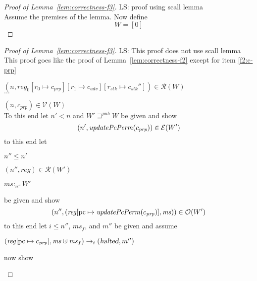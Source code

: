 \documentclass[a4paper]{article}
\newcommand{\update}[2]{[#1 \mapsto #2]}
\newcommand\lau[1]{{\color{purple} \sf \footnotesize {LS: #1}}\\}
\newcommand{\var}[1]{\mathit{#1}}
\newcommand{\hs}{\var{ms}}
\newcommand{\ms}{\hs}
\newcommand{\pcreg}{\mathrm{pc}}
\newcommand{\reg}{\var{reg}}
\newcommand{\heap}{\var{mem}}
\newcommand{\adv}{\var{adv}}
\newcommand{\stk}{\var{stk}}
\newcommand{\prp}{\var{prp}}
\newcommand{\halted}{\textsl{halted}}
\newcommand{\plainfun}[2]{
  \ifthenelse{\equal{#2}{}}
  {\mathit{#1}}
  {\mathit{#1}(#2)}
}
\newcommand{\updatePcPerm}[1]{\plainfun{updatePcPerm}{#1}}
\newcommand{\futurewk}{\mathbin{\sqsupseteq}^{\var{pub}}}
\newcommand{\heapSat}[3][\heap]{#1 :_{#2} #3}
\newcommand{\asmType}{\plaindom{AsmType}}
\newcommand{\plaindom}[1]{\mathrm{#1}}
\newcommand{\intr}[2]{\mathcal{#1}}
\newcommand{\valueintr}[1]{\intr{V}{#1}}
\newcommand{\exprintr}[1]{\intr{E}{#1}}
\newcommand{\regintr}[1]{\intr{R}{#1}}
\newcommand{\stdvr}{\valueintr{\asmType}}
\newcommand{\stder}{\exprintr{\asmType}}
\newcommand{\stdrr}{\regintr{\asmType}}
\newcommand{\observations}{\mathcal{O}}
\newcommand{\npair}[2][n]{\left(#1,#2 \right)}
\newcommand{\step}[1][]{\rightarrow_{#1}}
\begin{document}
\begin{lemma}
\begin{proof}[Proof of Lemma~\ref{lem:correctness-f3}]
\lau{proof using scall lemma}
Assume the premises of the lemma.
Now define 
\[
  W = [0 ]
\]
\end{proof}
\begin{proof}[Proof of Lemma~\ref{lem:correctness-f3}]
  \lau{This proof does not use scall lemma}
  This proof goes like the proof of Lemma~\ref{lem:correctness-f2} except for item \ref{f2:c-prp}
  \begin{enumproof}[start=3]
  \item $\npair{\reg_0\update{r_0}{c_{\var{prp}}}\update{r_1}{c_\adv}\update{r_\stk}{c_\stk''}} \in \stdrr(W)$ \\
    $\dots$
    \begin{enumproof}[start=3]
    \item $\npair{c_{\var{prp}}} \in \stdvr(W)$ \\
      To this end let $n' < n$ and $W' \futurewk W$ be given and show
      \[
        \npair[n']{\updatePcPerm{c_\prp}} \in \stder(W')
      \]
      to this end let 
      \begin{enumproof}
      \item $n'' \leq n'$
      \item $\npair[n'']{\reg} \in \stdrr(W')$
      \item $\heapSat[\ms]{n''}{W'}$ \label{f3:mem-sat-mid}
      \end{enumproof}
      be given and show
      \[
        \npair[n'']{(\reg\update{\pcreg}{\updatePcPerm{c_\prp}},\ms)} \in \observations(W')
      \]
      to this end let $i \leq n''$, $\ms_f$, and $m''$ be given and assume
      \begin{enumproof}[resume]
      \item $(\reg\update{\pcreg}{c_\prp},\ms \uplus \ms_f) \step[i] (\halted,m'')$ \label{f3:mid-exec}
      \end{enumproof}
      now show


\end{enumproof}
\end{enumproof}
\end{proof}
\end{lemma}
\end{document}
